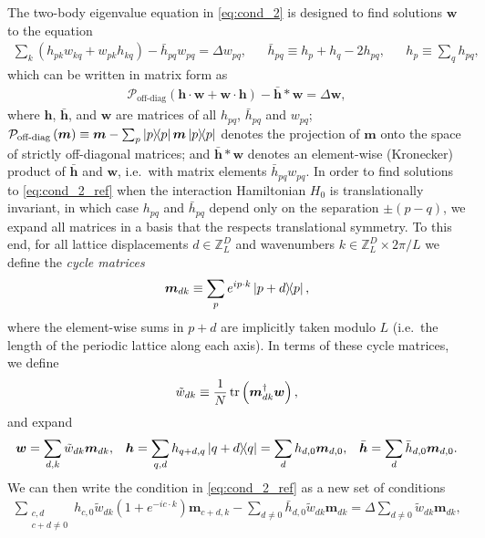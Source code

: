 \documentclass[nofootinbib,notitlepage,11pt]{revtex4-2}
\renewcommand{\t}{\text} %
\newcommand{\f}[2]{\dfrac{#1}{#2}} %
\newcommand{\p}[1]{\left(#1\right)} %
\renewcommand{\c}{\cdot} %
\newcommand{\m}{\bm} %
\newcommand{\1}{\mathds{1}}
\renewcommand{\P}{\mathcal{P}}
\newcommand{\ZZ}{\mathbb{Z}}
\begin{document}
The two-body eigenvalue equation in \eqref{eq:cond_2} is designed to
find solutions $\m w$ to the equation
\begin{align}
  \sum_k \p{h_{pk} w_{kq} + w_{pk} h_{kq}}
  - \bar h_{pq} w_{pq}
  = \Delta w_{pq},
  &&
  \bar h_{pq} \equiv h_p + h_q - 2h_{pq},
  &&
  h_p \equiv \sum_q h_{pq},
  \label{eq:cond_2_ref_start}
\end{align}
which can be written in matrix form as
\begin{align}
  \P_{\t{off-diag}}\p{\m h\c\m w + \m w\c\m h} - \bar{\m h} * \m w
  = \Delta \m w,
  \label{eq:cond_2_ref}
\end{align}
where $\m h$, $\bar{\m h}$, and $\m w$ are matrices of all $h_{pq}$,
$\bar h_{pq}$ and $w_{pq}$;
$\P_{\t{off-diag}}\p{\m m}\equiv \m m-\sum_p\op{p}\m m\op{p}$ denotes
the projection of $\m m$ onto the space of strictly off-diagonal
matrices; and $\bar{\m h}*\m w$ denotes an element-wise (Kronecker)
product of $\bar{\m h}$ and $\m w$, i.e.~with matrix elements
$\bar h_{pq}w_{pq}$.  In order to find solutions to
\eqref{eq:cond_2_ref} when the interaction Hamiltonian $H_0$ is
translationally invariant, in which case $h_{pq}$ and $\bar h_{pq}$
depend only on the separation $\pm\p{p-q}$, we expand all matrices in
a basis that the respects translational symmetry.  To this end, for
all lattice displacements $d\in\ZZ_L^D$ and wavenumbers
$k\in\ZZ_L^D\times2\pi/L$ we define the {\it cycle matrices}
\begin{align}
  \m m_{dk} \equiv \sum_p e^{ip\c k} \op{p+d}{p},
  \label{eq:cycle}
\end{align}
where the element-wise sums in $p+d$ are implicitly taken modulo $L$
(i.e.~the length of the periodic lattice along each axis).  In terms
of these cycle matrices, we define
\begin{align}
  \tilde w_{dk} \equiv \f1N \tr\p{\m m_{dk}^\dag \m w},
\end{align}
and expand
\begin{align}
  \m w = \sum_{d,k} \tilde w_{dk} \m m_{dk},
  &&
  \m h = \sum_{q,d} h_{q+d,q} \op{q+d}{q}
  = \sum_d h_{d,0} \m m_{d,0},
  &&
  \bar{\m h} = \sum_d \bar h_{d,0} \m m_{d,0}.
\end{align}
We can then write the condition in \eqref{eq:cond_2_ref} as a new set
of conditions
\begin{align}
  \sum_{\substack{c,d\\c+d\ne0}}
  h_{c,0} \tilde w_{dk} \p{1 + e^{-ic\c k}} \m m_{c+d,k}
  - \sum_{d\ne0} \bar h_{d,0} \tilde w_{dk} \m m_{dk}
  = \Delta \sum_{d\ne0} \tilde w_{dk} \m m_{dk},
\end{align}
\end{document}
